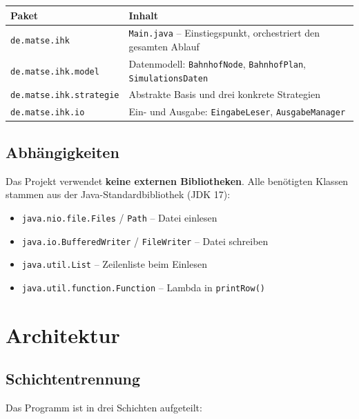 \documentclass[12pt,a4paper]{article}
\begin{document}
\begin{center}
\begin{tabular}{lp{9cm}}
\toprule
\textbf{Paket} & \textbf{Inhalt} \\
\midrule
\texttt{de.matse.ihk} & \texttt{Main.java} -- Einstiegspunkt, orchestriert den gesamten Ablauf \\
\texttt{de.matse.ihk.model} & Datenmodell: \texttt{BahnhofNode}, \texttt{BahnhofPlan}, \texttt{SimulationsDaten} \\
\texttt{de.matse.ihk.strategie} & Abstrakte Basis und drei konkrete Strategien \\
\texttt{de.matse.ihk.io} & Ein- und Ausgabe: \texttt{EingabeLeser}, \texttt{AusgabeManager} \\
\bottomrule
\end{tabular}
\end{center}

\subsection{Abhängigkeiten}

Das Projekt verwendet \textbf{keine externen Bibliotheken}. Alle benötigten Klassen stammen aus der Java-Standardbibliothek (JDK 17):

\begin{itemize}
    \item \texttt{java.nio.file.Files} / \texttt{Path} -- Datei einlesen
    \item \texttt{java.io.BufferedWriter} / \texttt{FileWriter} -- Datei schreiben
    \item \texttt{java.util.List} -- Zeilenliste beim Einlesen
    \item \texttt{java.util.function.Function} -- Lambda in \texttt{printRow()}
\end{itemize}

\section{Architektur}

\subsection{Schichtentrennung}

Das Programm ist in drei Schichten aufgeteilt:
\end{document}
